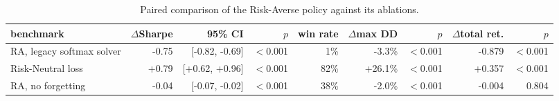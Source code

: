 \begin{table}[ht!]
\centering
\footnotesize
\setlength{\tabcolsep}{4pt}
\begin{tabular}{lrrrrrrrr}
\hline
benchmark & $\Delta$Sharpe & 95\% CI & $p$ & win rate & $\Delta$max DD & $p$ & $\Delta$total ret. & $p$ \\
\hline
RA, legacy softmax solver & -0.75 & [-0.82, -0.69] & $<$0.001 & 1\% & -3.3\% & $<$0.001 & -0.879 & $<$0.001 \\
Risk-Neutral loss & +0.79 & [+0.62, +0.96] & $<$0.001 & 82\% & +26.1\% & $<$0.001 & +0.357 & $<$0.001 \\
RA, no forgetting & -0.04 & [-0.07, -0.02] & $<$0.001 & 38\% & -2.0\% & $<$0.001 & -0.004 & 0.804 \\
\hline
\end{tabular}
\caption{Paired comparison of the Risk-Averse policy against its ablations.}
\label{tab:ablation_paired_covid}
\end{table}
